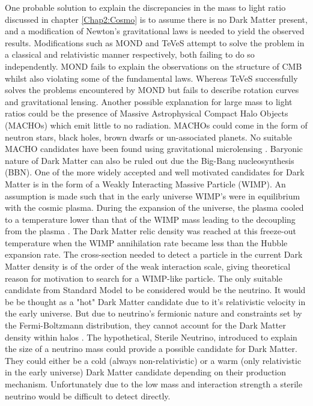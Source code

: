 One probable solution to explain the discrepancies in the mass to light ratio discussed in chapter \ref{Chap2:Cosmo} is to assume there is no Dark Matter present, and a modification of Newton's gravitational laws is needed to yield the observed results. Modifications such as MOND \cite{MOND} and TeVeS \cite{TeVeS} attempt to solve the problem in a classical and relativistic manner respectively, both failing to do so independently. MOND fails to explain the observations on the structure of CMB whilst also violating some of the fundamental laws. Whereas TeVeS successfully solves the problems encountered by MOND but fails to describe rotation curves and gravitational lensing.
Another possible explanation for large mass to light ratios could be the presence of Massive Astrophysical Compact Halo Objects (MACHOs) which emit little to no radiation. MACHOs could come in the form of neutron stars, black holes, brown dwarfs or un-associated planets. No suitable MACHO candidates have been found using gravitational microlensing \cite{MicroLens}. Baryonic nature of Dark Matter can also be ruled out due the Big-Bang nucleosynthesis (BBN)\cite{BBN}.
\newline
One of the more widely accepted and well motivated candidates for Dark Matter is in the form of a Weakly Interacting Massive Particle (WIMP). An assumption is made such that in the early universe WIMP's were in equilibrium with the cosmic plasma. During the expansion of the universe, the plasma cooled to a temperature lower than that of the WIMP mass leading to the decoupling from the plasma \cite{DMProd}. The Dark Matter relic density was reached at this freeze-out temperature when the WIMP annihilation rate became less than the Hubble expansion rate. The cross-section needed to detect a particle in the current Dark Matter density is of the order of the weak interaction scale, giving theoretical reason for motivation to search for a WIMP-like particle. 
\newline
The only suitable candidate from Standard Model to be considered would be the neutrino. It would be be thought as a "hot" Dark Matter candidate due to it's relativistic velocity in the early universe. But due to neutrino's fermionic nature and constraints set by the Fermi-Boltzmann distribution, they cannot account for the Dark Matter density within halos \cite{DirectDetection2015}. The hypothetical, Sterile Neutrino, introduced to explain the size of a neutrino mass could provide a possible candidate for Dark Matter. They could either be a cold (always non-relativistic) or a warm (only relativistic in the early universe) Dark Matter candidate depending on their production mechanism. Unfortunately due to the low mass and interaction strength a sterile neutrino would be difficult to detect directly. 

